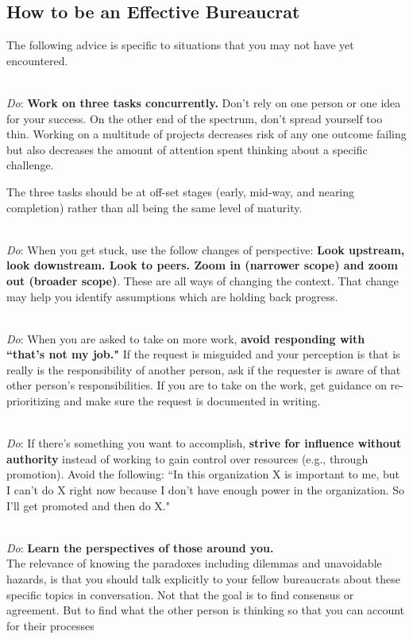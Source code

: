 \subsection*{How to be an Effective Bureaucrat}

The following advice is specific to situations that you may not have yet encountered. 

\ \\
\textit{Do}: \textbf{Work on three tasks concurrently.} Don't rely on one person or one idea for your success. On the other end of the spectrum, don't spread yourself too thin.
Working on a multitude of projects decreases risk of any one outcome failing but also decreases the amount of attention spent thinking about a specific challenge. 

The three tasks should be at off-set stages (early, mid-way, and nearing completion) rather than all being the same level of maturity.

\ \\
\textit{Do}: When you get stuck, use the follow changes of perspective:  
\textbf{Look upstream, look downstream. Look to peers. Zoom in (narrower scope) and zoom out (broader scope)}. These are all ways of changing the context. That change may help you identify assumptions which are holding back progress.

\ \\
\textit{Do}: When you are asked to take on more work, \textbf{avoid responding with ``that's not my job."} If the request is misguided and your perception is that is really is the responsibility of another person, ask if the requester is aware of that other person's responsibilities. If you are to  take on the work, get guidance on re-prioritizing and make sure the request is documented in writing. 

\ \\
\textit{Do}: If there's something you want to accomplish, \textbf{strive for influence without authority} instead of working to gain control over resources (e.g., through promotion). Avoid the following: ``In this organization X is important to me, but I can't do X right now because I don't have enough power in the organization. So I'll get promoted and then do X."

\ \\
\textit{Do}: \textbf{Learn the perspectives of those around you.}\\
The relevance of knowing the paradoxes including dilemmas and unavoidable hazards, is that you should talk explicitly to your fellow bureaucrats about these specific topics in conversation. Not that the goal is to find consensus or agreement. But to find what the other person is thinking so that you can account for their processes


